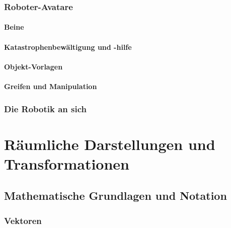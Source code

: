 \documentclass[a4paper, 11pt, accentcolor = tud3b]{tudreport}
\begin{document}
			\subsection{Roboter-Avatare} %

				\subsubsection{Beine} %

				\subsubsection{Katastrophenbewältigung und -hilfe} %

				\subsubsection{Objekt-Vorlagen} %

				\subsubsection{Greifen und Manipulation} %

			\subsection{Die Robotik an sich} %

	\chapter{Räumliche Darstellungen und Transformationen} %
		
		\section{Mathematische Grundlagen und Notation} %
			
			\subsection{Vektoren} %
\end{document}
